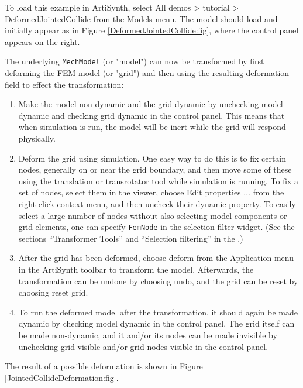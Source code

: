 To load this example in ArtiSynth, select {\sf All demos > tutorial >
DeformedJointedCollide} from the {\sf Models} menu. The model should load and
initially appear as in Figure \ref{DeformedJointedCollide:fig}, where
the control panel appears on the right.

The underlying {\tt MechModel} (or "model") can now be
transformed by first deforming the FEM model (or "grid") and
then using the resulting deformation field to effect the
transformation:

\begin{enumerate}

\item Make the model non-dynamic and the grid dynamic by unchecking
{\sf model dynamic} and checking {\sf grid dynamic} in the control
panel. This means that when simulation is run, the model will be inert
while the grid will respond physically.

\item Deform the grid using simulation. One easy way to do this is to
fix certain nodes, generally on or near the grid boundary, and then
move some of these using the translation or transrotator
tool while simulation is running. To fix a set of nodes, select
them in the viewer, choose {\sf Edit properties ...} from the
right-click context menu, and then uncheck their {\sf dynamic} property.
To easily select a large number of nodes without also selecting
model components or grid elements, one can specify {\tt FemNode}
in the selection filter widget. (See the sections
``Transformer Tools'' and ``Selection filtering'' in the
.)

\item After the grid has been deformed, choose {\sf deform} from the
{\sf Application} menu in the ArtiSynth toolbar to transform the model.
Afterwards, the transformation can be undone by choosing {\sf undo},
and the grid can be reset by choosing {\sf reset grid}.

\item To run the deformed model after the transformation, it should
again be made dynamic by checking {\sf model dynamic} in the control
panel.  The grid itself can be made non-dynamic, and it and/or its
nodes can be made invisible by unchecking {\sf grid visible} and/or
{\sf grid nodes visible} in the control panel.

\end{enumerate}

The result of a possible deformation is shown in Figure
\ref{JointedCollideDeformation:fig}.

